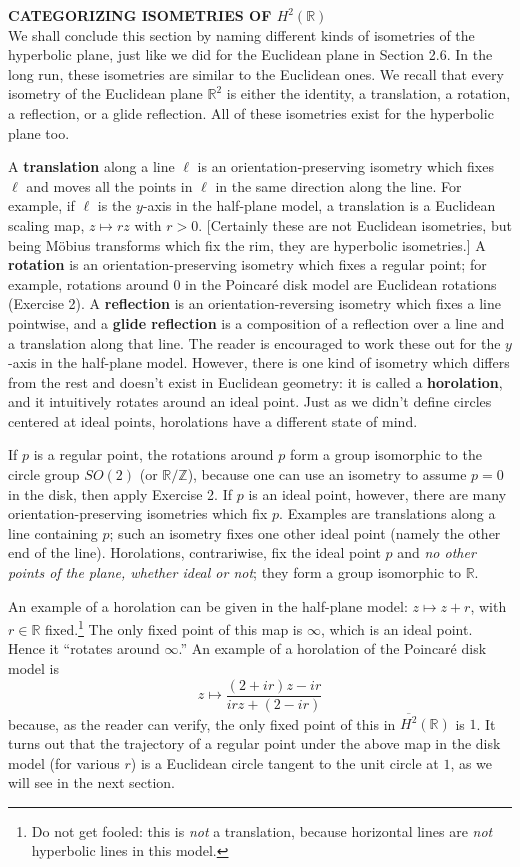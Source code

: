 \documentclass[leqno]{book}
\begin{document}
\noindent\textbf{CATEGORIZING ISOMETRIES OF $H^2(\mathbb R)$}\\

\noindent We shall conclude this section by naming different kinds of isometries of the hyperbolic plane, just like we did for the Euclidean plane in Section 2.6.  In the long run, these isometries are similar to the Euclidean ones.  We recall that every isometry of the Euclidean plane $\mathbb R^2$ is either the identity, a translation, a rotation, a reflection, or a glide reflection.  All of these isometries exist for the hyperbolic plane too.

A \textbf{translation} along a line $\ell$ is an orientation-preserving isometry which fixes $\ell$ and moves all the points in $\ell$ in the same direction along the line.  For example, if $\ell$ is the $y$-axis in the half-plane model, a translation is a Euclidean scaling map, $z\mapsto rz$ with $r>0$.  [Certainly these are not Euclidean isometries, but being M\"obius transforms which fix the rim, they are hyperbolic isometries.]  A \textbf{rotation} is an orientation-preserving isometry which fixes a regular point; for example, rotations around $0$ in the Poincar\'e disk model are Euclidean rotations (Exercise 2).  A \textbf{reflection} is an orientation-reversing isometry which fixes a line pointwise, and a \textbf{glide reflection} is a composition of a reflection over a line and a translation along that line.  The reader is encouraged to work these out for the $y$-axis in the half-plane model.  However, there is one kind of isometry which differs from the rest and doesn't exist in Euclidean geometry: it is called a \textbf{horolation}, and it intuitively rotates around an ideal point.  Just as we didn't define circles centered at ideal points, horolations have a different state of mind.

If $p$ is a regular point, the rotations around $p$ form a group isomorphic to the circle group $SO(2)$ (or $\mathbb R/\mathbb Z$), because one can use an isometry to assume $p=0$ in the disk, then apply Exercise 2.  If $p$ is an ideal point, however, there are many orientation-preserving isometries which fix $p$.  Examples are translations along a line containing $p$; such an isometry fixes one other ideal point (namely the other end of the line).  Horolations, contrariwise, fix the ideal point $p$ and \emph{no other points of the plane, whether ideal or not}; they form a group isomorphic to $\mathbb R$.

An example of a horolation can be given in the half-plane model: $z\mapsto z+r$, with $r\in\mathbb R$ fixed.\footnote{Do not get fooled: this is \emph{not} a translation, because horizontal lines are \emph{not} hyperbolic lines in this model.}  The only fixed point of this map is $\infty$, which is an ideal point.  Hence it ``rotates around $\infty$.''  An example of a horolation of the Poincar\'e disk model is
$$z\mapsto\frac{(2+ir)z-ir}{irz+(2-ir)}$$
because, as the reader can verify, the only fixed point of this in $\overline{H^2}(\mathbb R)$ is $1$.  It turns out that the trajectory of a regular point under the above map in the disk model (for various $r$) is a Euclidean circle tangent to the unit circle at $1$, as we will see in the next section.
\end{document}
